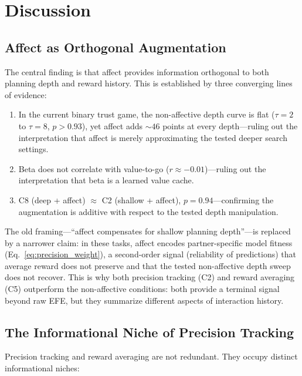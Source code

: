\documentclass[11pt,a4paper]{article}
\begin{document}
\section{Discussion}
\label{sec:discussion}

\subsection{Affect as Orthogonal Augmentation}

The central finding is that affect provides information orthogonal to both planning depth and reward history. This is established by three converging lines of evidence:

\begin{enumerate}[nosep]
  \item In the current binary trust game, the non-affective depth curve is flat ($\tau = 2$ to $\tau = 8$, $p > 0.93$), yet affect adds $\sim\!46$ points at every depth---ruling out the interpretation that affect is merely approximating the tested deeper search settings.
  \item Beta does not correlate with value-to-go ($r \approx -0.01$)---ruling out the interpretation that beta is a learned value cache.
  \item C8 (deep + affect) $\approx$ C2 (shallow + affect), $p = 0.94$---confirming the augmentation is additive with respect to the tested depth manipulation.
\end{enumerate}

The old framing---``affect compensates for shallow planning depth''---is replaced by a narrower claim: in these tasks, affect encodes partner-specific model fitness (Eq.~\ref{eq:precision_weight}), a second-order signal (reliability of predictions) that average reward does not preserve and that the tested non-affective depth sweep does not recover. This is why both precision tracking (C2) and reward averaging (C5) outperform the non-affective conditions: both provide a terminal signal beyond raw EFE, but they summarize different aspects of interaction history.

\subsection{The Informational Niche of Precision Tracking}

Precision tracking and reward averaging are not redundant. They occupy distinct informational niches:
\end{document}
